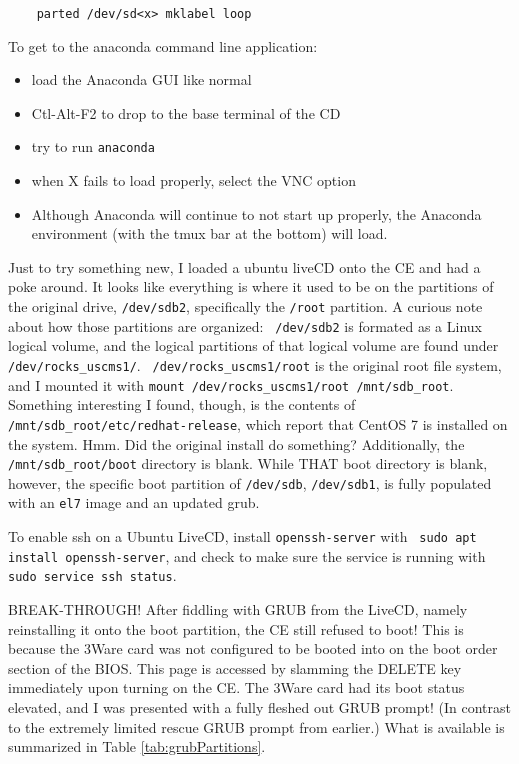 \documentclass[12pt]{article}
\begin{document}
\begin{tcolorbox}[title=Completely Wipe USB, colback=white, colframe=black,
  coltitle=green]
  \begin{verbatim}
    parted /dev/sd<x> mklabel loop
  \end{verbatim}
\end{tcolorbox}

\qq To get to the anaconda command line application:
\begin{itemize}
  \item load the Anaconda GUI like normal
  \item Ctl-Alt-F2 to drop to the base terminal of the CD
  \item try to run {\tt anaconda}
  \item when X fails to load properly, select the VNC option
  \item Although Anaconda will continue to not start up properly, the Anaconda
    environment (with the tmux bar at the bottom) will load.
\end{itemize}

\qq Just to try something new, I loaded a ubuntu liveCD onto the CE and had a
poke around. It looks like everything is where it used to be on the partitions
of the original drive, {\tt /dev/sdb2}, specifically the {\tt /root}
partition. A curious note about how those partitions are organized: {\tt
  /dev/sdb2} is formated as a Linux logical volume, and the logical partitions
of that logical volume are found under {\tt /dev/rocks\_uscms1/}. {\tt
  /dev/rocks\_uscms1/root} is the original root file system, and I mounted it
with {\tt mount /dev/rocks\_uscms1/root /mnt/sdb\_root}. Something interesting I
found, though, is the contents of {\tt /mnt/sdb\_root/etc/redhat-release}, which
report that CentOS 7 is installed on the system. Hmm. Did the original install
do something? Additionally, the {\tt /mnt/sdb\_root/boot} directory is
blank. While THAT boot directory is blank, however, the specific boot partition
of {\tt /dev/sdb}, {\tt /dev/sdb1}, is fully populated with an {\tt el7} image
and an updated grub.

\qq To enable ssh on a Ubuntu LiveCD, install {\tt openssh-server} with {\tt
  sudo apt install openssh-server}, and check to make sure the service is running
with {\tt sudo service ssh status}.

\qq BREAK-THROUGH! After fiddling with GRUB from the LiveCD, namely reinstalling
it onto the boot partition, the CE still refused to boot! This is because the
3Ware card was not configured to be booted into on the boot order section of the
BIOS. This page is accessed by slamming the DELETE key immediately upon
turning on the CE. The 3Ware card had its boot status elevated, and I was
presented with a fully fleshed out GRUB prompt! (In contrast to the extremely
limited rescue GRUB prompt from earlier.) What is available is summarized in
Table \ref{tab:grubPartitions}.
\end{document}

